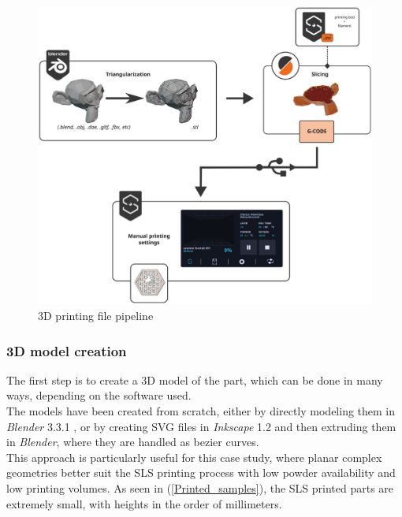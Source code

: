 \documentclass{article}
\begin{document}
                \begin{figure}[h!]
                    \centering 
                    \includegraphics[width=\textwidth]{Pictures/3dprint_file_pipeline_scheme.eps}
                    \caption{3D printing file pipeline}
                    \label{fig:3dprint_file_pipeline_scheme}
                \end{figure}

        \subsubsection{3D model creation\label{3D_model_creation}}

        The first step is to create a 3D model of the part, which can be done in many ways, 
        depending on the software used. \\

        The models have been created from scratch, either by directly modeling them in \textit{Blender} 3.3.1 \autocites{Blender},
        or by creating SVG files in \textit{Inkscape} 1.2 \autocites{Inkscape} and then extruding them in \textit{Blender}, where
        they are handled as bezier curves. \\

        This approach is particularly useful for this case study, where planar complex geometries better suit the SLS printing process
        with low powder availability and low printing volumes. As seen in (\ref{Printed_samples}), the SLS printed parts 
        are extremely small, with heights in the order of millimeters. \\
        
\end{document}
